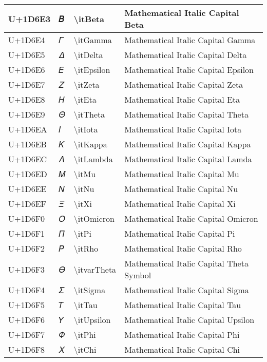 \begin{table}[h]
\begin{tabulary}{\linewidth}{|L|L|L|L|}
\hline
U+1D6E3 & 𝛣 & {\textbackslash}itBeta & Mathematical Italic Capital Beta \\
\hline
U+1D6E4 & 𝛤 & {\textbackslash}itGamma & Mathematical Italic Capital Gamma \\
\hline
U+1D6E5 & 𝛥 & {\textbackslash}itDelta & Mathematical Italic Capital Delta \\
\hline
U+1D6E6 & 𝛦 & {\textbackslash}itEpsilon & Mathematical Italic Capital Epsilon \\
\hline
U+1D6E7 & 𝛧 & {\textbackslash}itZeta & Mathematical Italic Capital Zeta \\
\hline
U+1D6E8 & 𝛨 & {\textbackslash}itEta & Mathematical Italic Capital Eta \\
\hline
U+1D6E9 & 𝛩 & {\textbackslash}itTheta & Mathematical Italic Capital Theta \\
\hline
U+1D6EA & 𝛪 & {\textbackslash}itIota & Mathematical Italic Capital Iota \\
\hline
U+1D6EB & 𝛫 & {\textbackslash}itKappa & Mathematical Italic Capital Kappa \\
\hline
U+1D6EC & 𝛬 & {\textbackslash}itLambda & Mathematical Italic Capital Lamda \\
\hline
U+1D6ED & 𝛭 & {\textbackslash}itMu & Mathematical Italic Capital Mu \\
\hline
U+1D6EE & 𝛮 & {\textbackslash}itNu & Mathematical Italic Capital Nu \\
\hline
U+1D6EF & 𝛯 & {\textbackslash}itXi & Mathematical Italic Capital Xi \\
\hline
U+1D6F0 & 𝛰 & {\textbackslash}itOmicron & Mathematical Italic Capital Omicron \\
\hline
U+1D6F1 & 𝛱 & {\textbackslash}itPi & Mathematical Italic Capital Pi \\
\hline
U+1D6F2 & 𝛲 & {\textbackslash}itRho & Mathematical Italic Capital Rho \\
\hline
U+1D6F3 & 𝛳 & {\textbackslash}itvarTheta & Mathematical Italic Capital Theta Symbol \\
\hline
U+1D6F4 & 𝛴 & {\textbackslash}itSigma & Mathematical Italic Capital Sigma \\
\hline
U+1D6F5 & 𝛵 & {\textbackslash}itTau & Mathematical Italic Capital Tau \\
\hline
U+1D6F6 & 𝛶 & {\textbackslash}itUpsilon & Mathematical Italic Capital Upsilon \\
\hline
U+1D6F7 & 𝛷 & {\textbackslash}itPhi & Mathematical Italic Capital Phi \\
\hline
U+1D6F8 & 𝛸 & {\textbackslash}itChi & Mathematical Italic Capital Chi \\

\end{tabulary}
\end{table}
